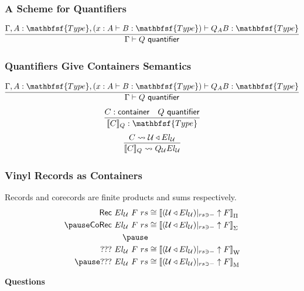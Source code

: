 \documentclass[12pt]{beamer}
\def\Type{\mathbfsf{Type}}
\begin{document}
\begin{frame}
  \frametitle{A Scheme for Quantifiers}
  \pause
  \[
    \infer{\Gamma\vdash Q\ \mathsf{quantifier}}{
      \Gamma,A:\Type, (x:A\vdash B:\Type) \vdash Q_AB:\Type
    }
  \]
\end{frame}

\begin{frame}
  \frametitle{Quantifiers Give Containers Semantics}
  \[
    \infer{\Gamma\vdash Q\ \mathsf{quantifier}}{
      \Gamma,A:\Type, (x:A\vdash B:\Type) \vdash Q_AB:\Type
    }
  \]\pause
  \[
    \infer{\llbracket C\rrbracket_Q : \Type}{
      C : \container &
      Q\ \mathsf{quantifier}
    }
  \]\pause
  \[
    \infer{
      \llbracket C\rrbracket_Q \leadsto Q_\mathcal{U} El_\mathcal{U}
    }{
      C \leadsto \mkcon{\mathcal{U}}{El_\mathcal{U}}
    }
  \]
\end{frame}

\begin{frame}
  \frametitle{Vinyl Records as Containers}\pause
  Records and corecords are finite products and sums respectively.\pause
  \[
    \begin{aligned}
      \mathsf{Rec}\ El_\mathcal{U}\ F\ rs
        &\cong \left\llbracket (\mkcon{\mathcal{U}}{El_\mathcal{U}})|_{rs\ni-}\uparrow F \right\rrbracket_\Pi\\ \pause
      \mathsf{CoRec}\ El_\mathcal{U}\ F\ rs
        &\cong \left\llbracket (\mkcon{\mathcal{U}}{El_\mathcal{U}})|_{rs\ni-}\uparrow F \right\rrbracket_\Sigma\\ \pause
      \\
      ???\ El_\mathcal{U}\ F\ rs
        &\cong \left\llbracket (\mkcon{\mathcal{U}}{El_\mathcal{U}})|_{rs\ni-}\uparrow F \right\rrbracket_\mathrm{W}\\ \pause
      ???\ El_\mathcal{U}\ F\ rs
        &\cong \left\llbracket (\mkcon{\mathcal{U}}{El_\mathcal{U}})|_{rs\ni-}\uparrow F \right\rrbracket_\mathrm{M}
    \end{aligned}
  \]
\end{frame}

\begin{frame}
  \centerline{\textbf{Questions}}
\end{frame}
\end{document}
